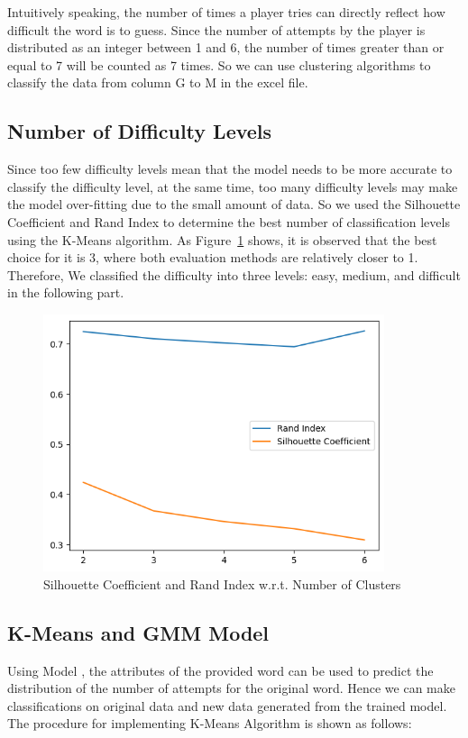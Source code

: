 \documentclass[12pt]{article}
\begin{document}
\vspace{0.3cm}
\noindent
Intuitively speaking, the number of times a player tries can directly reflect how difficult the word is to guess. Since the number of attempts by the player is distributed as an integer between 1 and 6, the number of times greater than or equal to 7 will be counted as 7 times. So we can use clustering algorithms to classify the data from column G to M in the excel file. 

\subsection{Number of Difficulty Levels}
Since too few difficulty levels mean that the model needs to be more accurate to classify the difficulty level, at the same time, too many difficulty levels may make the model over-fitting due to the small amount of data. So we used the Silhouette Coefficient and Rand Index to determine the best number of classification levels using the K-Means algorithm. As Figure~\ref{RI_SC} shows, it is observed that the best choice for it is 3, where both evaluation methods are relatively closer to 1. Therefore, We classified the difficulty into three levels: easy, medium, and difficult in the following part.

\begin{figure}[h]
    \centering
    \includegraphics[width=10cm]{figures/RI_SC.png}
    \caption{Silhouette Coefficient and Rand Index w.r.t. Number of Clusters}
    \label{RI_SC}
\end{figure}

\subsection{K-Means and GMM Model}
Using Model \uppercase\expandafter{}, the attributes of the provided word can be used to predict the distribution of the number of attempts for the original word. Hence we can make classifications on original data and new data generated from the trained model.  
\vspace{0.3cm}
\noindent
The procedure for implementing K-Means Algorithm is shown as follows:
\end{document}
